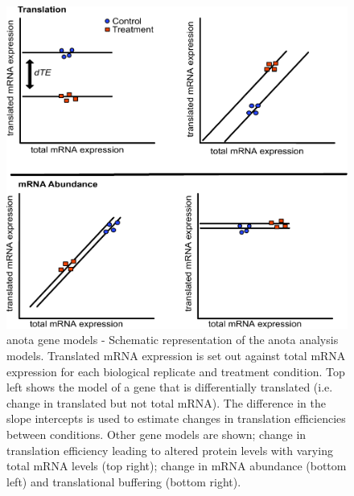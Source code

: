 \documentclass[12pt,openany]{book}
\begin{document}
\begin{figure}
  \includegraphics{./figures/geneModes_anota_Larsson.pdf}
  \caption{anota gene models - Schematic representation of the anota analysis models. Translated mRNA expression is set out against total mRNA expression for each biological replicate and treatment condition. Top left shows the model of a gene that is differentially translated (i.e. change in translated but not total mRNA). The difference in the slope intercepts is used to estimate changes in translation efficiencies between conditions. Other gene models are shown; change in translation efficiency leading to altered protein levels with varying total mRNA levels (top right); change in mRNA abundance (bottom left) and translational buffering (bottom right).
  \label{fig:anota}}
\end{figure}
\end{document}
